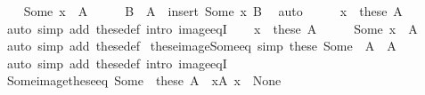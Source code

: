 \begin{isabellebody}
%
\isadelimproof
%
\endisadelimproof
%
\isatagproof
{}\isamarkupfalse%
\isanewline
\ \ \isamarkupfalse%
\ {\isachardoublequoteopen}Some\ x\ {\isasymin}\ A{\isachardoublequoteclose}\isanewline
\ \ \isamarkupfalse%
\ \isamarkupfalse%
\ B\ \ {\isachardoublequoteopen}A\ {\isacharequal}{\kern0pt}\ insert\ {\isacharparenleft}{\kern0pt}Some\ x{\isacharparenright}{\kern0pt}\ B{\isachardoublequoteclose}\ \isamarkupfalse%
\ auto\isanewline
\ \ \isamarkupfalse%
\ \isamarkupfalse%
\ {\isachardoublequoteopen}x\ {\isasymin}\ these\ A{\isachardoublequoteclose}\ \isamarkupfalse%
\ {\isacharparenleft}{\kern0pt}auto\ simp\ add{\isacharcolon}{\kern0pt}\ these{\isacharunderscore}{\kern0pt}def\ intro{\isacharbang}{\kern0pt}{\isacharcolon}{\kern0pt}\ image{\isacharunderscore}{\kern0pt}eqI{\isacharparenright}{\kern0pt}\isanewline
{}\isamarkupfalse%
\isanewline
\ \ \isamarkupfalse%
\ {\isachardoublequoteopen}x\ {\isasymin}\ these\ A{\isachardoublequoteclose}\isanewline
\ \ \isamarkupfalse%
\ \isamarkupfalse%
\ {\isachardoublequoteopen}Some\ x\ {\isasymin}\ A{\isachardoublequoteclose}\ \isamarkupfalse%
\ {\isacharparenleft}{\kern0pt}auto\ simp\ add{\isacharcolon}{\kern0pt}\ these{\isacharunderscore}{\kern0pt}def{\isacharparenright}{\kern0pt}\isanewline
{}\isamarkupfalse%
%
\endisatagproof
{\isafoldproof}%
%
\isadelimproof
\isanewline
%
\endisadelimproof
\isanewline
{}\isamarkupfalse%
\ these{\isacharunderscore}{\kern0pt}image{\isacharunderscore}{\kern0pt}Some{\isacharunderscore}{\kern0pt}eq\ {\isacharbrackleft}{\kern0pt}simp{\isacharbrackright}{\kern0pt}{\isacharcolon}{\kern0pt}\ {\isachardoublequoteopen}these\ {\isacharparenleft}{\kern0pt}Some\ {\isacharbackquote}{\kern0pt}\ A{\isacharparenright}{\kern0pt}\ {\isacharequal}{\kern0pt}\ A{\isachardoublequoteclose}\isanewline
%
\isadelimproof
\ \ %
\endisadelimproof
%
\isatagproof
{}\isamarkupfalse%
\ {\isacharparenleft}{\kern0pt}auto\ simp\ add{\isacharcolon}{\kern0pt}\ these{\isacharunderscore}{\kern0pt}def\ intro{\isacharbang}{\kern0pt}{\isacharcolon}{\kern0pt}\ image{\isacharunderscore}{\kern0pt}eqI{\isacharparenright}{\kern0pt}%
\endisatagproof
{\isafoldproof}%
%
\isadelimproof
\isanewline
%
\endisadelimproof
\isanewline
{}\isamarkupfalse%
\ Some{\isacharunderscore}{\kern0pt}image{\isacharunderscore}{\kern0pt}these{\isacharunderscore}{\kern0pt}eq{\isacharcolon}{\kern0pt}\ {\isachardoublequoteopen}Some\ {\isacharbackquote}{\kern0pt}\ these\ A\ {\isacharequal}{\kern0pt}\ {\isacharbraceleft}{\kern0pt}x{\isasymin}A{\isachardot}{\kern0pt}\ x\ {\isasymnoteq}\ None{\isacharbraceright}{\kern0pt}{\isachardoublequoteclose}\isanewline

\end{isabellebody}
